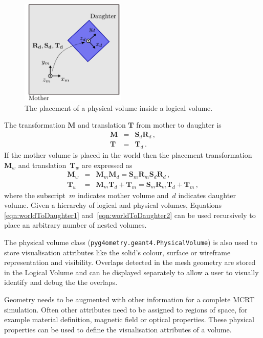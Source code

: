 \documentclass[final,5p,times,twocolumn]{elsarticle}
\newcommand{\pyinline}[1]{\lstinline[postbreak={}]{#1}}
\begin{document}
\begin{figure}[htb!]
\begin{center}
\includegraphics[width=5cm]{./diagrams/lvToPv.pdf}
\caption{The placement of a physical volume inside a logical volume.}
\label{fig:lvToPv}
\end{center}
\end{figure} 

The transformation  $\mathbf{M}$  and translation $\mathbf{T}$ from mother to daughter is 
\begin{eqnarray}
\mathbf{M} 	& = &  \mathbf{S}_d  \mathbf{R}_d\,, \\
\mathbf{T} 	& = &  \mathbf{T}_d\,.
\end{eqnarray}
%
If the mother volume is placed in the world then the placement transformation~$\mathbf{M}_w$ and translation~$\mathbf{T}_w$ are expressed as
\begin{eqnarray}
\mathbf{M}_w	  	& = & \mathbf{M}_m \mathbf{M}_d  = \mathbf{S}_m \mathbf{R}_m  \mathbf{S}_d \mathbf{R}_d\, ,				\label{eqn:worldToDaughter1}\\
\mathbf{T}	_w 		& = & \mathbf{M}_m \mathbf{T}_d + \mathbf{T}_m= \mathbf{S}_m \mathbf{R}_m \mathbf{T}_d + \mathbf{T}_m\,,  \label{eqn:worldToDaughter2}
\end{eqnarray}
where the subscript~$m$ indicates mother volume and~$d$ indicates daughter volume. Given a hierarchy of logical and physical volumes, 
Equations \ref{eqn:worldToDaughter1} and~\ref{eqn:worldToDaughter2} can be used recursively to place an arbitrary number of nested volumes.

The physical volume class (\pyinline{pyg4ometry.geant4.PhysicalVolume}) is also used to store visualisation attributes like the solid's 
colour, surface or wireframe representation and visibility. Overlaps detected in the mesh geometry are
stored in the Logical Volume and can be  displayed separately to allow a user to visually identify and debug the the overlaps.   

Geometry needs to be augmented with other information for a complete MCRT simulation. Often other attributes need to be 
assigned to regions of space, for example material definition, magnetic field or optical properties. These physical properties 
can be used to define the visualisation attributes of a volume. 
\end{document}
